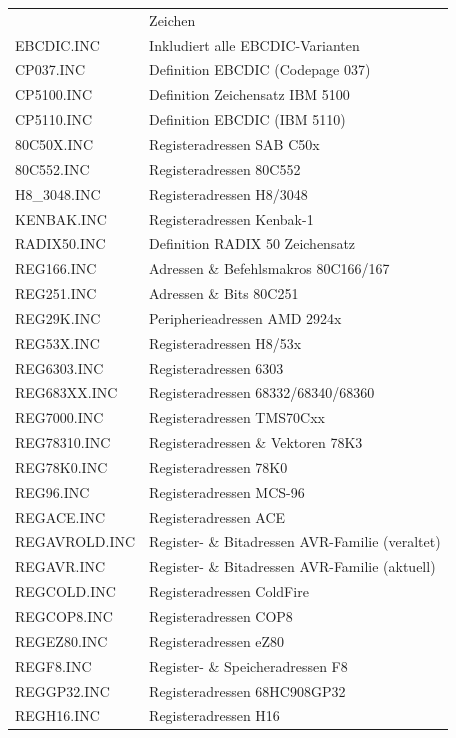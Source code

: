 \documentclass[12pt,a4paper,twoside]{report}
\begin{document}
\begin{center}
\begin{longtable}{|l|l|}
                  & Zeichen \\
EBCDIC.INC        & Inkludiert alle EBCDIC-Varianten \\
CP037.INC         & Definition EBCDIC (Codepage 037) \\
CP5100.INC        & Definition Zeichensatz IBM 5100 \\
CP5110.INC        & Definition EBCDIC (IBM 5110) \\
80C50X.INC        & Registeradressen SAB C50x \\
80C552.INC        & Registeradressen 80C552 \\
H8\_3048.INC      & Registeradressen H8/3048 \\
KENBAK.INC        & Registeradressen Kenbak-1 \\
RADIX50.INC       & Definition RADIX 50 Zeichensatz \\
REG166.INC        & Adressen \& Befehlsmakros 80C166/167 \\
REG251.INC        & Adressen \& Bits 80C251 \\
REG29K.INC        & Peripherieadressen AMD 2924x \\
REG53X.INC        & Registeradressen H8/53x \\
REG6303.INC       & Registeradressen 6303 \\
REG683XX.INC      & Registeradressen 68332/68340/68360 \\
REG7000.INC       & Registeradressen TMS70Cxx \\
REG78310.INC      & Registeradressen \& Vektoren 78K3 \\
REG78K0.INC       & Registeradressen 78K0 \\
REG96.INC         & Registeradressen MCS-96 \\
REGACE.INC        & Registeradressen ACE \\
REGAVROLD.INC     & Register- \& Bitadressen AVR-Familie (veraltet)\\
REGAVR.INC        & Register- \& Bitadressen AVR-Familie (aktuell)\\
REGCOLD.INC       & Registeradressen ColdFire \\
REGCOP8.INC       & Registeradressen COP8 \\
REGEZ80.INC       & Registeradressen eZ80 \\
REGF8.INC         & Register- \& Speicheradressen F8 \\
REGGP32.INC       & Registeradressen 68HC908GP32 \\
REGH16.INC        & Registeradressen H16 \\

\end{longtable}
\end{center}
\end{document}

